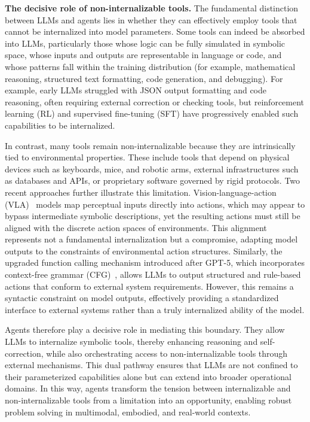 \documentclass[11pt]{article}
\begin{document}
\textbf{The decisive role of non-internalizable tools.}  
The fundamental distinction between LLMs and agents lies in whether they can effectively employ tools that cannot be internalized into model parameters. Some tools can indeed be absorbed into LLMs, particularly those whose logic can be fully simulated in symbolic space, whose inputs and outputs are representable in language or code, and whose patterns fall within the training distribution (for example, mathematical reasoning, structured text formatting, code generation, and debugging). For example, early LLMs struggled with JSON output formatting and code reasoning, often requiring external correction or checking tools, but reinforcement learning (RL) and supervised fine-tuning (SFT) have progressively enabled such capabilities to be internalized.  

In contrast, many tools remain non-internalizable because they are intrinsically tied to environmental properties. These include tools that depend on physical devices such as keyboards, mice, and robotic arms, external infrastructures such as databases and APIs, or proprietary software governed by rigid protocols. Two recent approaches further illustrate this limitation. Vision-language-action (VLA)~\citep{black2025pi0} models map perceptual inputs directly into actions, which may appear to bypass intermediate symbolic descriptions, yet the resulting actions must still be aligned with the discrete action spaces of environments. This alignment represents not a fundamental internalization but a compromise, adapting model outputs to the constraints of environmental action structures. Similarly, the upgraded function calling mechanism introduced after GPT-5, which incorporates context-free grammar (CFG)~\citep{contextfreegrammar2025}, allows LLMs to output structured and rule-based actions that conform to external system requirements. However, this remains a syntactic constraint on model outputs, effectively providing a standardized interface to external systems rather than a truly internalized ability of the model.  

Agents therefore play a decisive role in mediating this boundary. They allow LLMs to internalize symbolic tools, thereby enhancing reasoning and self-correction, while also orchestrating access to non-internalizable tools through external mechanisms. This dual pathway ensures that LLMs are not confined to their parameterized capabilities alone but can extend into broader operational domains. In this way, agents transform the tension between internalizable and non-internalizable tools from a limitation into an opportunity, enabling robust problem solving in multimodal, embodied, and real-world contexts.  
\end{document}
